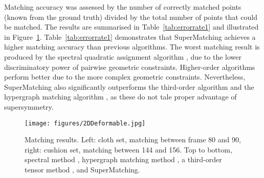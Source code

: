 Matching accuracy was assessed by the number of correctly matched points (known from the  ground truth) divided by the total number of points that could be matched.
The results are summarised in Table~\ref{tab:errorrate1} and illustrated in Figure~\ref{fig:2DDeformable}.
Table~\ref{tab:errorrate1} demonstrates that SuperMatching achieves a higher matching accuracy than previous algorithms.
The worst matching result is produced by the spectral quadratic assignment algorithm \cite{Cour06},
due to the lower discriminatory power of pairwise geometric constraints.
Higher-order algorithms perform better due to the more complex geometric constraints.
Nevertheless, SuperMatching also significantly outperforms the third-order algorithm \cite{Duchenne09,Duchenne2011} and the hypergraph matching algorithm \cite{Zass08},
as these do not tale proper advantage of supersymmetry.

\begin{figure}[tb]
\centering
  \texttt{[image: figures/2DDeformable.jpg]}
  \caption{Matching results. Left: cloth set, matching between frame 80 and 90, right: cushion set, matching between 144 and 156.
  Top to bottom, spectral method \cite{Cour06}, hypergraph matching method \cite{Zass08}, a third-order tensor method \cite{Duchenne09,Duchenne2011}, and SuperMatching.}
\label{fig:2DDeformable}
\end{figure}

